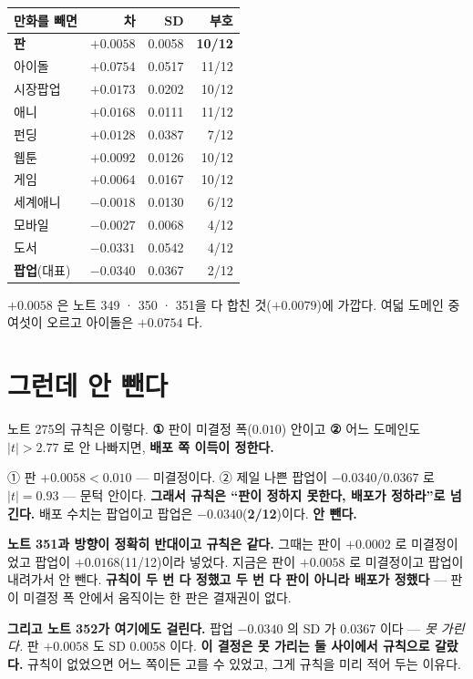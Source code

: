 \documentclass[11pt]{article}
\begin{document}
\begin{center}
\begin{tabular}{lrrr}
\hline
만화를 빼면 & 차 & SD & 부호 \\
\hline
\textbf{판}   & $\mathbf{+0.0058}$ & 0.0058 & \textbf{10/12} \\
\hline
아이돌   & $+0.0754$ & 0.0517 & 11/12 \\
시장팝업 & $+0.0173$ & 0.0202 & 10/12 \\
애니     & $+0.0168$ & 0.0111 & 11/12 \\
펀딩     & $+0.0128$ & 0.0387 & 7/12 \\
웹툰     & $+0.0092$ & 0.0126 & 10/12 \\
게임     & $+0.0064$ & 0.0167 & 10/12 \\
세계애니 & $-0.0018$ & 0.0130 & 6/12 \\
모바일   & $-0.0027$ & 0.0068 & 4/12 \\
도서     & $-0.0331$ & 0.0542 & 4/12 \\
\textbf{팝업}(대표) & $\mathbf{-0.0340}$ & 0.0367 & 2/12 \\
\hline
\end{tabular}
\end{center}

$+0.0058$ 은 노트 349 · 350 · 351을 다 합친 것($+0.0079$)에 가깝다. 여덟
도메인 중 여섯이 오르고 아이돌은 $+0.0754$ 다.

\section{그런데 안 뺀다}

노트 275의 규칙은 이렇다. \textbf{①} 판이 미결정 폭($0.010$) 안이고
\textbf{②} 어느 도메인도 $|t| > 2.77$ 로 안 나빠지면, \textbf{배포 쪽
이득이 정한다.}

① 판 $+0.0058 < 0.010$ --- 미결정이다. ② 제일 나쁜 팝업이
$-0.0340/0.0367$ 로 $|t| = 0.93$ --- 문턱 안이다. \textbf{그래서 규칙은
``판이 정하지 못한다, 배포가 정하라''로 넘긴다.} 배포 수치는 팝업이고
팝업은 $-0.0340$(\textbf{2/12})이다. \textbf{안 뺀다.}

\textbf{노트 351과 방향이 정확히 반대이고 규칙은 같다.} 그때는 판이
$+0.0002$ 로 미결정이었고 팝업이 $+0.0168$(11/12)이라 넣었다. 지금은 판이
$+0.0058$ 로 미결정이고 팝업이 내려가서 안 뺀다. \textbf{규칙이 두 번 다
정했고 두 번 다 판이 아니라 배포가 정했다} --- 판이 미결정 폭 안에서
움직이는 한 판은 결재권이 없다.

\textbf{그리고 노트 352가 여기에도 걸린다.} 팝업 $-0.0340$ 의 SD 가
$0.0367$ 이다 --- \emph{못 가린다.} 판 $+0.0058$ 도 SD $0.0058$ 이다.
\textbf{이 결정은 못 가리는 둘 사이에서 규칙으로 갈랐다.} 규칙이 없었으면
어느 쪽이든 고를 수 있었고, 그게 규칙을 미리 적어 두는 이유다.
\end{document}
